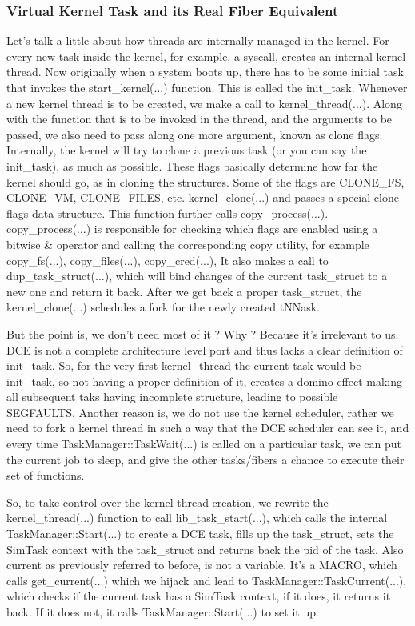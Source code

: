 \documentclass{sig-alternate}
\begin{document}
\subsubsection{Virtual Kernel Task and its Real Fiber Equivalent}
Let’s talk a little about how threads are internally managed in the kernel. For every new task inside the kernel, for example, a syscall, 
creates an internal kernel thread. Now originally when a system boots up, there has to be some initial task that invokes the start\_kernel(...) 
function. This is called the init\_task. Whenever a new kernel thread is to be created, we make a call to kernel\_thread(...). Along with the 
function that is to be invoked in the thread, and the arguments to be passed, we also need to pass along one more argument, known as clone flags. 
Internally, the kernel will try to clone a previous task (or you can say the init\_task), as much as possible. These flags basically determine 
how far the kernel should go, as in cloning the structures. Some of the flags are CLONE\_FS, CLONE\_VM, CLONE\_FILES, etc. kernel\_clone(...) and 
passes a special clone flags data structure. This function further calls copy\_process(...). copy\_process(...) is responsible for checking which 
flags are enabled using a bitwise \& operator and calling the corresponding copy utility, for example copy\_fs(...), copy\_files(...), copy\_cred(...),
It also makes a call to dup\_task\_struct(...), which will bind changes of the current task\_struct to a new one and return it back. After we get 
back a proper task\_struct, the kernel\_clone(...) schedules a fork for the newly created tNNask.

But the point is, we don’t need most of it ? Why ?  Because it’s irrelevant to us. DCE is not a complete architecture level port and thus lacks a 
clear definition of init\_task. So, for the very first kernel\_thread the current task would be init\_task, so not having a proper definition of it, 
creates a domino effect making all subsequent taks having incomplete structure, leading to possible SEGFAULTS. Another reason is, we do not use 
the kernel scheduler, rather we need to fork a kernel thread in such a way that the DCE scheduler can see it, and every time 
TaskManager::TaskWait(...)  is called on a particular task, we can put the current job to sleep, and give the other tasks/fibers a chance to 
execute their set of functions. 

So, to take  control over the kernel thread creation, we rewrite the kernel\_thread(...) function to call lib\_task\_start(...), which calls the 
internal TaskManager::Start(...) to create a DCE task, fills up the task\_struct, sets the SimTask context with the task\_struct and returns back 
the pid of the task. Also current as previously referred to before, is not a variable. It’s a MACRO, which calls get\_current(...) which we hijack 
and lead to TaskManager::TaskCurrent(...), which checks if the current task has a SimTask context, if it does, it returns it back. 
If it does not, it calls TaskManager::Start(...) to set it up.
 
\end{document}
